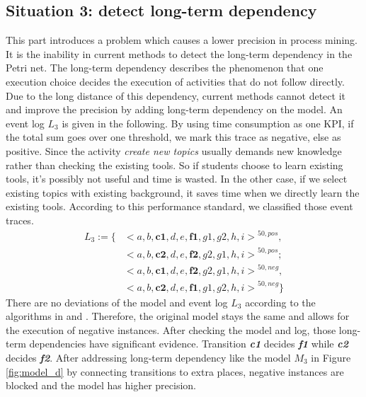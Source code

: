 \subsection{Situation 3: \small{detect long-term dependency}}
This part introduces a problem which causes a lower precision in process mining. It is the inability in current methods to detect the long-term dependency in the Petri net. The long-term dependency describes the phenomenon that one execution choice decides the execution of activities that do not follow directly. Due to the long distance of this dependency, current methods cannot detect it and improve the precision by adding long-term dependency on the model. 
An event log $L_3$ is given in the following. By using time consumption as one KPI, if the total sum goes over one threshold, we mark this trace as negative, else as positive. Since the activity \emph{create new topics} usually demands new knowledge rather than checking the existing tools. So if students choose to learn existing tools, it's possibly not useful and time is wasted. In the other case, if we select existing topics with existing background, it saves time when we directly learn the existing tools. According to this performance standard, we classified those event traces.
\begin{align*}
L_3:= \{ & { <a,b,\textbf{c1},d,e,\textbf{f1},g1,g2, h,i>}^{50, pos}, \\   &{<a,b,\textbf{c2},d,e,\textbf{f2},g2,g1, h,i>}^{50, pos} ; \\
 & {<a,b,\textbf{c1},d,e,\textbf{f2},g2,g1,h,i>}^{50, neg}, \\
& {<a,b,\textbf{c2},d,e,\textbf{f1},g1,g2,h,i>}^{50, neg}  \}
\end{align*}
There are no deviations of the model and event log $L_3$ according to the  algorithms in \cite{fahland2015model} and \cite{dees2017enhancing}. Therefore, the original model stays the same and allows for the execution of negative instances. After checking the model and log, those long-term dependencies have significant evidence. Transition \textbf{\emph{c1}} decides \textbf{\emph{f1}} while \textbf{\emph{c2}} decides \textbf{\emph{f2}}.  After addressing long-term dependency like the model $M_3$ in Figure \ref{fig:model_d} by connecting transitions to extra places, 
negative instances are blocked and the model has higher precision.

